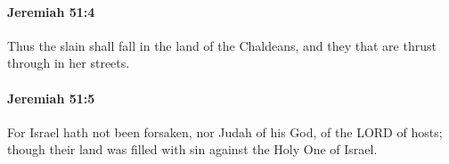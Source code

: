 		\paragraph{Jeremiah 51:4} %
			\label{JEREMIAH-51-4}

			Thus the slain shall fall in the land of the Chaldeans, and they that are thrust through in her streets.


		\paragraph{Jeremiah 51:5} %
			\label{JEREMIAH-51-5}

			For Israel hath not been forsaken, nor Judah of his God, of the LORD of hosts; though their land was filled with sin against the Holy One of Israel.


